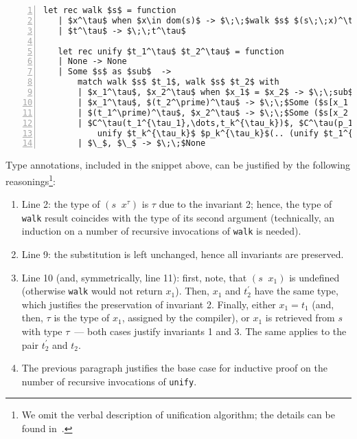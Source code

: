 \documentclass[10pt, oneside, nocopyrightspace]{sigplanconf}
\begin{document}
\begin{lstlisting}[mathescape=true,numbers=left,numberstyle=\tiny,stepnumber=1,numbersep=-5pt]
   let rec walk $s$ = function
   | $x^\tau$ when $x\in dom(s)$ -> $\;\;$walk $s$ $(s\;\;x)^\tau$
   | $t^\tau$ -> $\;\;t^\tau$

   let rec unify $t_1^\tau$ $t_2^\tau$ = function
   | None -> None
   | Some $s$ as $sub$  ->
       match walk $s$ $t_1$, walk $s$ $t_2$ with
       | $x_1^\tau$, $x_2^\tau$ when $x_1$ = $x_2$ -> $\;\;sub$
       | $x_1^\tau$, $(t_2^\prime)^\tau$ -> $\;\;$Some ($s[x_1 \gets t_2^\prime]$)
       | $(t_1^\prime)^\tau$, $x_2^\tau$ -> $\;\;$Some ($s[x_2 \gets t_1^\prime]$)
       | $C^\tau(t_1^{\tau_1},\dots,t_k^{\tau_k})$, $C^\tau(p_1^{\tau_1},\dots,p_k^{\tau_k})$ -> 
           unify $t_k^{\tau_k}$ $p_k^{\tau_k}$(.. (unify $t_1^{\tau_1}$ $p_1^{\tau_1}$ $sub$)$..$)
       | $\_$, $\_$ -> $\;\;$None
\end{lstlisting}

Type annotations, included in the snippet above, can be justified by the following 
reasonings\footnote{We omit the verbal description of unification algorithm; 
the details can be found in~\cite{MicroKanren}.}:

\begin{enumerate}
\item Line 2: the type of \mbox{$(s\;\;x^\tau)$} is $\tau$ due to the invariant 2; hence, 
the type of \lstinline{walk} result coincides with the type of its second argument (technically,
an induction on a number of recursive invocations of \lstinline{walk} is needed).

\item Line 9: the substitution is left unchanged, hence all invariants are preserved.

\item Line 10 (and, symmetrically, line 11): first, note, that \mbox{$(s\;\;x_1)$} is undefined
(otherwise \lstinline{walk} would not return $x_1$). Then, $x_1$ and $t_2^\prime$ have the
same type, which justifies the preservation of invariant 2. Finally, either \mbox{$x_1=t_1$}
(and, then, $\tau$ is the type of $x_1$, assigned by the compiler), or $x_1$ is retrieved
from $s$ with type $\tau$~--- both cases justify invariants 1 and 3. The same applies to 
the pair $t_2^\prime$ and $t_2$.

\item The previous paragraph justifies the base case for inductive proof on the number of
recursive invocations of \lstinline{unify}.
\end{enumerate}
\end{document}
